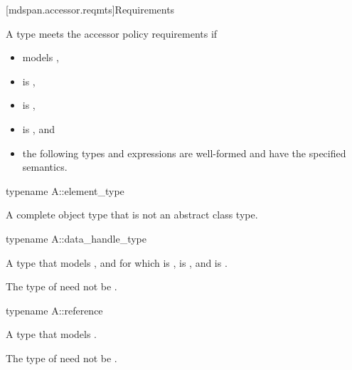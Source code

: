 [mdspan.accessor.reqmts]{Requirements}

\pnum
A type  meets the accessor policy requirements if
\begin{itemize}
\item
{} models ,
\item
{} is ,
\item
{} is ,
\item
{} is , and
\item
the following types and expressions
are well-formed and have the specified semantics.
\end{itemize}

\begin{itemdecl}
typename A::element_type
\end{itemdecl}

\begin{itemdescr}
\pnum
\result
A complete object type that is not an abstract class type.
\end{itemdescr}

\begin{itemdecl}
typename A::data_handle_type
\end{itemdecl}

\begin{itemdescr}
\pnum
\result
A type that models , and
for which  is ,
 is , and
 is .
\begin{note}
The type of  need not be .
\end{note}
\end{itemdescr}

\begin{itemdecl}
typename A::reference
\end{itemdecl}

\begin{itemdescr}
\pnum
\result
A type that models
.
\begin{note}
The type of  need not be .
\end{note}
\end{itemdescr}


